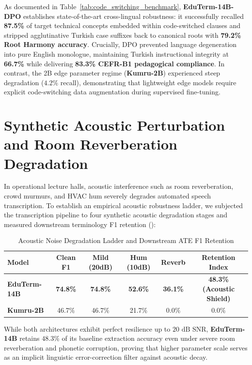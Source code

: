 \documentclass[a4paper,12pt]{report}
\begin{document}
As documented in Table~\ref{tab:code_switching_benchmark}, \textbf{EduTerm-14B-DPO} establishes state-of-the-art cross-lingual robustness: it successfully recalled \textbf{87.5\%} of target technical concepts embedded within code-switched clauses and stripped agglutinative Turkish case suffixes back to canonical roots with \textbf{79.2\% Root Harmony accuracy}. Crucially, DPO prevented language degeneration into pure English monologue, maintaining Turkish instructional integrity at \textbf{66.7\%} while delivering \textbf{83.3\% CEFR-B1 pedagogical compliance}. In contrast, the 2B edge parameter regime (\textbf{Kumru-2B}) experienced steep degradation ($4.2\%$ recall), demonstrating that lightweight edge models require explicit code-switching data augmentation during supervised fine-tuning.


\section{Synthetic Acoustic Perturbation and Room Reverberation Degradation}
\label{sec:acoustic_noise_robustness}
In operational lecture halls, acoustic interference such as room reverberation, crowd murmurs, and HVAC hum severely degrades automated speech transcription. To establish an empirical acoustic robustness ladder, we subjected the transcription pipeline to four synthetic acoustic degradation stages and measured downstream terminology F1 retention ():

\begin{table}[htbp]
\centering
\small
\caption{Acoustic Noise Degradation Ladder and Downstream ATE F1 Retention}
\label{tab:acoustic_noise_robustness}
\scriptsize\setlength{\tabcolsep}{2pt}
\begin{tabularx}{\textwidth}{>{\RaggedRight\arraybackslash}Xccccc}
\hline
\textbf{Model} & \textbf{Clean F1} & \textbf{Mild (20dB)} & \textbf{Hum (10dB)} & \textbf{Reverb} & \textbf{Retention Index} \\
\hline
\textbf{EduTerm-14B} & \textbf{74.8\%} & \textbf{74.8\%} & \textbf{52.6\%} & \textbf{36.1\%} & \textbf{48.3\% (Acoustic Shield)} \\
\textbf{Kumru-2B} & 46.7\% & 46.7\% & 21.7\% & 0.0\% & 0.0\% \\
\hline
\end{tabularx}
\end{table}

While both architectures exhibit perfect resilience up to $20\text{ dB SNR}$, \textbf{EduTerm-14B} retains $48.3\%$ of its baseline extraction accuracy even under severe room reverberation and phonetic corruption, proving that higher parameter scale serves as an implicit linguistic error-correction filter against acoustic decay.
\end{document}
